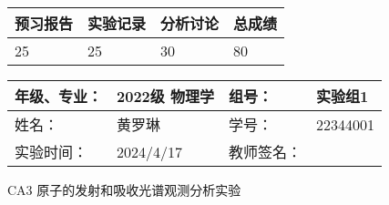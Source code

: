 \documentclass[dvipsnames, svgnames,a4paper,11pt]{article}
\begin{document}
	
	\begin{table}
		\renewcommand\arraystretch{1.7}
		\begin{tabularx}{\textwidth}{
				|X|X|X|X
				|X|X|X|X|}
			\hline
			\multicolumn{2}{|c|}{预习报告}&\multicolumn{2}{|c|}{实验记录}&\multicolumn{2}{|c|}{分析讨论}&\multicolumn{2}{|c|}{总成绩}\\
			\hline
			\LARGE25 & & \LARGE25 & & \LARGE30 & & \LARGE80 & \\
			\hline
		\end{tabularx}
	\end{table}
	
	\begin{table}
		\renewcommand\arraystretch{1.7}
		\begin{tabularx}{\textwidth}{|X|X|X|X|}
			\hline
			年级、专业： & 2022级 物理学 &组号： &实验组1 \\
			\hline
			姓名： &   黄罗琳 & 学号： &  22344001 \\
			\hline
			实验时间： & 2024/4/17 & 教师签名： & \\
			\hline
		\end{tabularx}
	\end{table}
	
	\begin{center}
		\LARGE CA3 \quad 原子的发射和吸收光谱观测分析实验
	\end{center}
	
\end{document}
